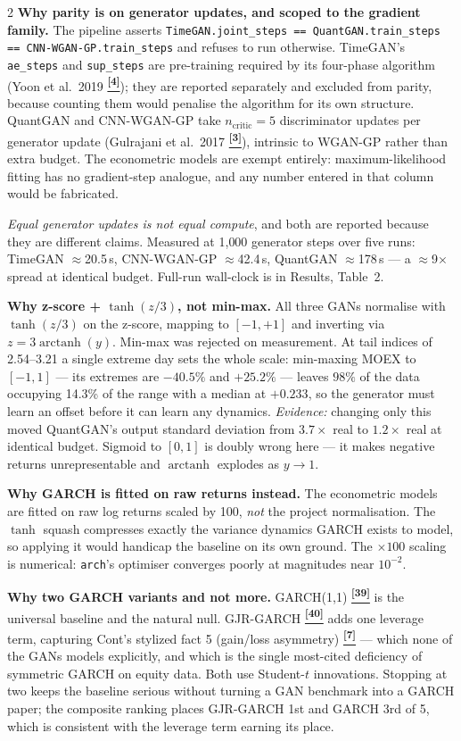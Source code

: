 \documentclass[10pt]{article}
\newcommand{\tcite}[1]{%
  \hyperlink{R:#1}{\textsuperscript{\scriptsize\textbf{[#1]}}}}
\begin{document}
\begin{multicols}{2}
\smallskip
\textbf{Why parity is on generator updates, and scoped to the gradient family.}
The pipeline asserts \texttt{TimeGAN.joint\_steps == QuantGAN.train\_steps == CNN-WGAN-GP.train\_steps} and refuses to run otherwise. TimeGAN's \texttt{ae\_steps} and \texttt{sup\_steps} are pre-training required by its four-phase algorithm (Yoon et al.\ 2019\tcite{4}); they are reported separately and excluded from parity, because counting them would penalise the algorithm for its own structure. QuantGAN and CNN-WGAN-GP take $n_\text{critic}=5$ discriminator updates per generator update (Gulrajani et al.\ 2017\tcite{3}), intrinsic to WGAN-GP rather than extra budget. The econometric models are exempt entirely: maximum-likelihood fitting has no gradient-step analogue, and any number entered in that column would be fabricated.

\textit{Equal generator updates is not equal compute}, and both are reported because they are different claims. Measured at 1{,}000 generator steps over five runs: TimeGAN $\approx$20.5\,s, CNN-WGAN-GP $\approx$42.4\,s, QuantGAN $\approx$178\,s --- a $\approx$9$\times$ spread at identical budget. Full-run wall-clock is in Results, Table~2.

\smallskip
\textbf{Why z-score + $\tanh(z/3)$, not min-max.}
All three GANs normalise with $\tanh(z/3)$ on the z-score, mapping to $[-1,+1]$ and inverting via $z = 3\operatorname{arctanh}(y)$. Min-max was rejected on measurement. At tail indices of 2.54--3.21 a single extreme day sets the whole scale: min-maxing MOEX to $[-1,1]$ --- its extremes are \(-40.5\%\) and \(+25.2\%\) --- leaves $98\%$ of the data occupying 14.3\% of the range with a median at \(+0.233\), so the generator must learn an offset before it can learn any dynamics. \textit{Evidence:} changing only this moved QuantGAN's output standard deviation from $3.7\times$ real to $1.2\times$ real at identical budget. Sigmoid to $[0,1]$ is doubly wrong here --- it makes negative returns unrepresentable and $\operatorname{arctanh}$ explodes as $y\to1$.

\smallskip
\textbf{Why GARCH is fitted on raw returns instead.}
The econometric models are fitted on raw log returns scaled by 100, \emph{not} the project normalisation. The $\tanh$ squash compresses exactly the variance dynamics GARCH exists to model, so applying it would handicap the baseline on its own ground. The $\times100$ scaling is numerical: \texttt{arch}'s optimiser converges poorly at magnitudes near $10^{-2}$.

\smallskip
\textbf{Why two GARCH variants and not more.}
GARCH(1,1)\tcite{39} is the universal baseline and the natural null. GJR-GARCH\tcite{40} adds one leverage term, capturing Cont's stylized fact 5 (gain/loss asymmetry)\tcite{7} --- which none of the GANs models explicitly, and which is the single most-cited deficiency of symmetric GARCH on equity data. Both use Student-$t$ innovations. Stopping at two keeps the baseline serious without turning a GAN benchmark into a GARCH paper; the composite ranking places GJR-GARCH 1st and GARCH 3rd of 5, which is consistent with the leverage term earning its place.

\end{multicols}
\end{document}
